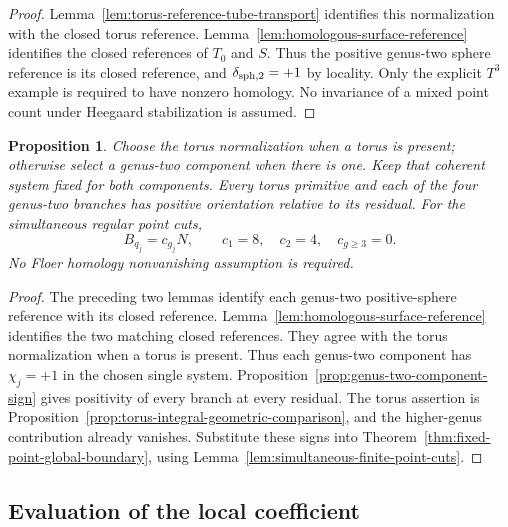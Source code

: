 \documentclass[11pt]{amsart}
\newtheorem{proposition}[theorem]{Proposition}
\theoremstyle{definition}
\theoremstyle{remark}
\theoremstyle{plain}
\begin{document}
\begin{proof}
Lemma~\ref{lem:torus-reference-tube-transport}
identifies this normalization with the
closed torus reference.
Lemma~\ref{lem:homologous-surface-reference}
identifies the closed references of $T_0$
and $S$. Thus the positive genus-two
sphere reference is its closed reference,
and $\delta_{{\rm sph},2}=+1$ by locality.
Only the explicit $T^3$ example is
required to have nonzero homology.
No invariance of a mixed point count
under Heegaard stabilization is assumed.
\end{proof}

\begin{proposition}\label{prop:simultaneous-integral-local-signs}
Choose the torus normalization when a torus is present;
otherwise select a genus-two component when there is one.
Keep that coherent system fixed for both components.
Every torus primitive and each of the four genus-two
branches has positive orientation relative to its residual.
For the simultaneous regular point cuts,
\begin{equation}\label{eq:simultaneous-integral-local-signs}
 B_{q_j}=c_{g_j}N,\qquad
               c_1=8,\quad c_2=4,\quad c_{g\ge3}=0.
\end{equation}
No Floer homology nonvanishing assumption is required.
\end{proposition}

\begin{proof}
The preceding two lemmas identify each genus-two
positive-sphere reference with its closed reference.
Lemma~\ref{lem:homologous-surface-reference} identifies
the two matching closed references. They agree with
the torus normalization when a torus is present.
Thus each genus-two component has $\chi_j=+1$
in the chosen single system.
Proposition~\ref{prop:genus-two-component-sign}
gives positivity of every branch at every residual.
The torus assertion is
Proposition~\ref{prop:torus-integral-geometric-comparison},
and the higher-genus contribution already vanishes.
Substitute these signs into
Theorem~\ref{thm:fixed-point-global-boundary}, using
Lemma~\ref{lem:simultaneous-finite-point-cuts}.
\end{proof}


\subsection{Evaluation of the local coefficient}\label{sec:coefficients}
\end{document}
